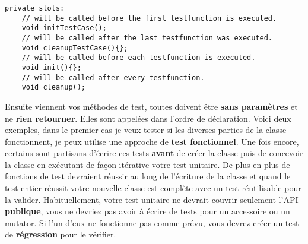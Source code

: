 \begin{verbatim}
private slots:
    // will be called before the first testfunction is executed.
    void initTestCase();
    // will be called after the last testfunction was executed.
    void cleanupTestCase(){};
    // will be called before each testfunction is executed.
    void init(){};
    // will be called after every testfunction.
    void cleanup();
\end{verbatim}

Ensuite viennent vos méthodes de test, toutes doivent être \textbf{sans paramètres} et ne \textbf{rien retourner}. Elles sont appelées dans l'ordre de déclaration. Voici deux exemples, dans le premier cas je veux tester si les diverses parties de la classe fonctionnent, je peux utilise une approche de \textbf{test fonctionnel}. Une fois encore, certains sont partisans d'écrire ces tests \textbf{avant} de créer la classe puis de concevoir la classe en exécutant de façon itérative votre test unitaire. De plus en plus de fonctions de test devraient réussir au long de l'écriture de la classe et quand le test entier réussit votre nouvelle classe est complète avec un test réutilisable pour la valider.
Habituellement, votre test unitaire ne devrait couvrir seulement l'API \textbf{publique}, vous ne devriez pas avoir à écrire de tests pour un accessoire ou un mutator. Si l'un d'eux ne fonctionne pas comme prévu, vous devrez créer un test de \textbf{régression} pour le vérifier.

